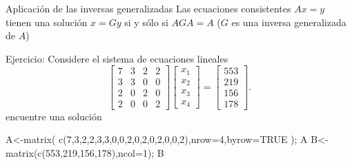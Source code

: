 \documentclass[
  ignorenonframetext,
  aspectratio=169,
  spanish,
]{beamer}
\newenvironment{Shaded}{\begin{snugshade}}{\end{snugshade}}
\newcommand{\AttributeTok}[1]{\textcolor[rgb]{0.40,0.45,0.13}{#1}}
\newcommand{\ConstantTok}[1]{\textcolor[rgb]{0.56,0.35,0.01}{#1}}
\newcommand{\DecValTok}[1]{\textcolor[rgb]{0.68,0.00,0.00}{#1}}
\newcommand{\FunctionTok}[1]{\textcolor[rgb]{0.28,0.35,0.67}{#1}}
\newcommand{\NormalTok}[1]{\textcolor[rgb]{0.00,0.23,0.31}{#1}}
\newcommand{\OtherTok}[1]{\textcolor[rgb]{0.00,0.23,0.31}{#1}}
\begin{document}
\begin{frame}[fragile]{Aplicación de las inversas generalizadas}
\label{aplicaciuxf3n-de-las-inversas-generalizadas}
Las ecuaciones consistentes \(Ax=y\) tienen una solución \(x=Gy\) si y
sólo si \(AGA=A\) (\(G\) es una inversa generalizada de \(A\))

\begin{block}{Ejercicio:}
\label{ejercicio-4}
Considere el sistema de ecuaciones lineales\\
\begin{equation}\label{eje_sol_ecuaciones}
\begin{bmatrix}
  7&3&2&2\\
  3&3&0&0\\
  2&0&2&0\\
  2&0&0&2
\end{bmatrix}\begin{bmatrix}
  x_1 \\
  x_2 \\
  x_3 \\
  x_4
\end{bmatrix}=\begin{bmatrix}
  553 \\
  219 \\
  156 \\
  178
\end{bmatrix}.
\end{equation} encuentre una solución

\begin{Shaded}
\begin{Highlighting}[]
\NormalTok{A}\OtherTok{\textless{}{-}}\FunctionTok{matrix}\NormalTok{( }\FunctionTok{c}\NormalTok{(}\DecValTok{7}\NormalTok{,}\DecValTok{3}\NormalTok{,}\DecValTok{2}\NormalTok{,}\DecValTok{2}\NormalTok{,}\DecValTok{3}\NormalTok{,}\DecValTok{3}\NormalTok{,}\DecValTok{0}\NormalTok{,}\DecValTok{0}\NormalTok{,}\DecValTok{2}\NormalTok{,}\DecValTok{0}\NormalTok{,}\DecValTok{2}\NormalTok{,}\DecValTok{0}\NormalTok{,}\DecValTok{2}\NormalTok{,}\DecValTok{0}\NormalTok{,}\DecValTok{0}\NormalTok{,}\DecValTok{2}\NormalTok{),}\AttributeTok{nrow=}\DecValTok{4}\NormalTok{,}\AttributeTok{byrow=}\ConstantTok{TRUE}\NormalTok{ ); A  }
\NormalTok{B}\OtherTok{\textless{}{-}}\FunctionTok{matrix}\NormalTok{(}\FunctionTok{c}\NormalTok{(}\DecValTok{553}\NormalTok{,}\DecValTok{219}\NormalTok{,}\DecValTok{156}\NormalTok{,}\DecValTok{178}\NormalTok{),}\AttributeTok{ncol=}\DecValTok{1}\NormalTok{); B}
\end{Highlighting}
\end{Shaded}
\end{block}
\end{frame}
\end{document}

